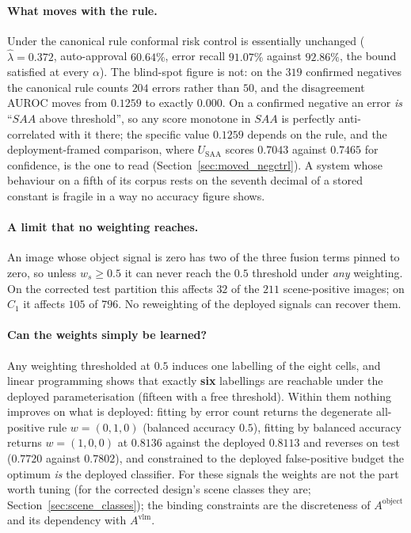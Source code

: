\documentclass[12pt,a4paper]{report}
\begin{document}
\paragraph{What moves with the rule.} Under the canonical rule conformal risk control is essentially unchanged ($\hat\lambda = 0.372$, auto-approval $60.64\%$, error recall $91.07\%$ against $92.86\%$, the bound satisfied at every $\alpha$). The blind-spot figure is not: on the $319$ confirmed negatives the canonical rule counts $204$ errors rather than $50$, and the disagreement AUROC moves from $0.1259$ to exactly $0.000$. On a confirmed negative an error \emph{is} ``$SAA$ above threshold'', so any score monotone in $SAA$ is perfectly anti-correlated with it there; the specific value $0.1259$ depends on the rule, and the deployment-framed comparison, where $U_{\text{SAA}}$ scores $0.7043$ against $0.7465$ for confidence, is the one to read (Section~\ref{sec:moved_negctrl}). A system whose behaviour on a fifth of its corpus rests on the seventh decimal of a stored constant is fragile in a way no accuracy figure shows.

\paragraph{A limit that no weighting reaches.} An image whose object signal is zero has two of the three fusion terms pinned to zero, so unless $w_s \ge 0.5$ it can never reach the $0.5$ threshold under \emph{any} weighting. On the corrected test partition this affects $32$ of the $211$ scene-positive images; on $C_1$ it affects $105$ of
$796$. No reweighting of the deployed signals can recover them.

\paragraph{Can the weights simply be learned?} Any weighting thresholded at $0.5$ induces one labelling of the eight cells, and linear programming shows that exactly \textbf{six} labellings are reachable under the deployed parameterisation (fifteen with a free threshold). Within them nothing improves on what is deployed: fitting by error count returns the degenerate all-positive rule $w=(0,1,0)$ (balanced accuracy $0.5$), fitting by balanced accuracy returns $w=(1,0,0)$ at $0.8136$ against the deployed $0.8113$ and reverses on test ($0.7720$ against $0.7802$), and constrained to the deployed false-positive budget the optimum \emph{is} the deployed classifier. For these signals the weights are not the part worth tuning (for the corrected design's scene classes they are; Section~\ref{sec:scene_classes}); the binding constraints are the discreteness of $A^{\text{object}}$ and its dependency with $A^{\text{vlm}}$.
\end{document}
